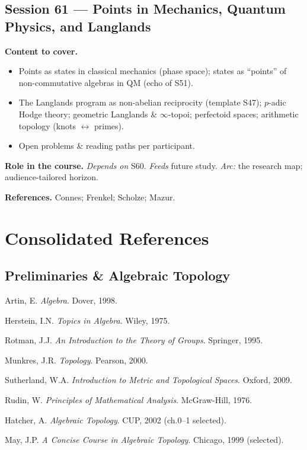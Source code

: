 \documentclass[11pt,a4paper]{article}
\newcommand{\sess}[2]{\subsection[#1. #2]{Session #1 --- #2}}
\newcommand{\chead}{\par\smallskip\noindent\textbf{Content to cover.}}
\newcommand{\role}[1]{\par\smallskip\noindent\textbf{Role in the course.} #1}
\newcommand{\srefs}[1]{\par\smallskip\noindent\textbf{References.} #1}
\begin{document}
	\sess{61}{Points in Mechanics, Quantum Physics, and Langlands}
	\chead
	\begin{itemize}
		\item Points as states in classical mechanics (phase space); states as ``points'' of non-commutative algebras in QM (echo of S51).
		\item The Langlands program as non-abelian reciprocity (template S47); $p$-adic Hodge theory; geometric Langlands \& $\infty$-topoi; perfectoid spaces; arithmetic topology (knots $\leftrightarrow$ primes).
		\item Open problems \& reading paths per participant.
	\end{itemize}
	\role{\emph{Depends on} S60. \emph{Feeds} future study. \emph{Arc:} the research map; audience-tailored horizon.}
	\srefs{Connes; Frenkel; Scholze; Mazur.}
	
	\section*{Consolidated References}
	
	\subsection*{Preliminaries \& Algebraic Topology}
	\begin{enumerate}[label={[\arabic*]}]
		\item Artin, E. \emph{Algebra}. Dover, 1998.
		\item Herstein, I.N. \emph{Topics in Algebra}. Wiley, 1975.
		\item Rotman, J.J. \emph{An Introduction to the Theory of Groups}. Springer, 1995.
		\item Munkres, J.R. \emph{Topology}. Pearson, 2000.
		\item Sutherland, W.A. \emph{Introduction to Metric and Topological Spaces}. Oxford, 2009.
		\item Rudin, W. \emph{Principles of Mathematical Analysis}. McGraw-Hill, 1976.
		\item Hatcher, A. \emph{Algebraic Topology}. CUP, 2002 (ch.0--1 selected).
		\item May, J.P. \emph{A Concise Course in Algebraic Topology}. Chicago, 1999 (selected).
	\end{enumerate}
\end{document}

